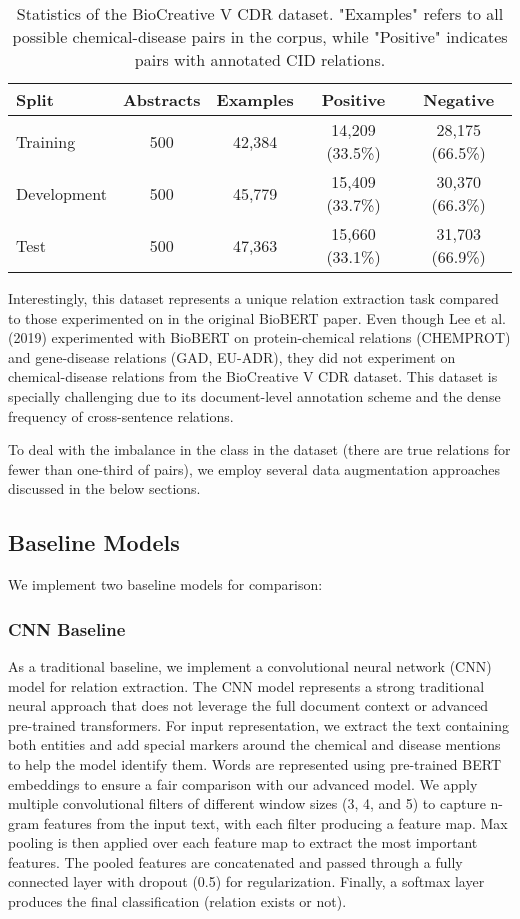 \documentclass{amia}
\begin{document}
\begin{table}[H]
\begin{center}
\begin{tabular}{|l|c|c|c|c|}
\hline
\textbf{Split} & \textbf{Abstracts} & \textbf{Examples} & \textbf{Positive} & \textbf{Negative} \\
\hline
Training & 500 & 42,384 & 14,209 (33.5\%) & 28,175 (66.5\%) \\
\hline
Development & 500 & 45,779 & 15,409 (33.7\%) & 30,370 (66.3\%) \\
\hline
Test & 500 & 47,363 & 15,660 (33.1\%) & 31,703 (66.9\%) \\
\hline
\end{tabular}
\end{center}
\caption{Statistics of the BioCreative V CDR dataset. "Examples" refers to all possible chemical-disease pairs in the corpus, while "Positive" indicates pairs with annotated CID relations.}
\label{tab}
\end{table}

Interestingly, this dataset represents a unique relation extraction task compared to those experimented on in the original BioBERT paper. Even though Lee et al. (2019) experimented with BioBERT on protein-chemical relations (CHEMPROT) and gene-disease relations (GAD, EU-ADR), they did not experiment on chemical-disease relations from the BioCreative V CDR dataset. This dataset is specially challenging due to its document-level annotation scheme and the dense frequency of cross-sentence relations.

To deal with the imbalance in the class in the dataset (there are true relations for fewer than one-third of pairs), we employ several data augmentation approaches discussed in the below sections.

\subsection*{Baseline Models}

We implement two baseline models for comparison:

\subsubsection*{CNN Baseline}
As a traditional baseline, we implement a convolutional neural network (CNN) model for relation extraction. The CNN model represents a strong traditional neural approach that does not leverage the full document context or advanced pre-trained transformers. For input representation, we extract the text containing both entities and add special markers around the chemical and disease mentions to help the model identify them. Words are represented using pre-trained BERT embeddings to ensure a fair comparison with our advanced model. We apply multiple convolutional filters of different window sizes (3, 4, and 5) to capture n-gram features from the input text, with each filter producing a feature map. Max pooling is then applied over each feature map to extract the most important features. The pooled features are concatenated and passed through a fully connected layer with dropout (0.5) for regularization. Finally, a softmax layer produces the final classification (relation exists or not).
\end{document}
